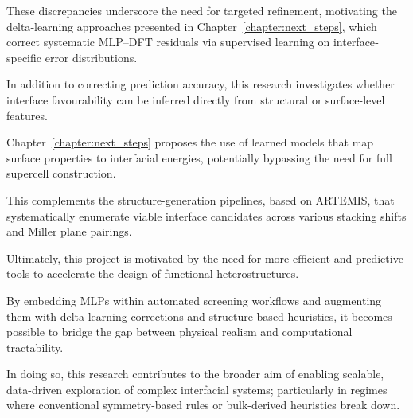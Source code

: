 These discrepancies underscore the need for targeted refinement, motivating the delta‐learning approaches presented in
Chapter~\ref{chapter:next_steps}, which correct systematic MLP–DFT residuals via supervised learning on
interface‐specific error distributions.

\label{para:feature_based_interface_prediction} %

In addition to correcting prediction accuracy, this research investigates whether interface favourability can be
inferred directly from structural or surface-level features.

Chapter~\ref{chapter:next_steps} proposes the use of learned models that map surface properties to interfacial energies,
potentially bypassing the need for full supercell construction.

This complements the structure-generation pipelines, based on ARTEMIS, that systematically enumerate viable interface
candidates across various stacking shifts and Miller plane pairings.

\label{para:project_motivation} %

Ultimately, this project is motivated by the need for more efficient and predictive tools to accelerate the design of
functional heterostructures.

By embedding MLPs within automated screening workflows and augmenting them with delta-learning corrections and
structure-based heuristics, it becomes possible to bridge the gap between physical realism and computational
tractability.

In doing so, this research contributes to the broader aim of enabling scalable, data-driven exploration of complex
interfacial systems; particularly in regimes where conventional symmetry-based rules or bulk-derived heuristics break
down.